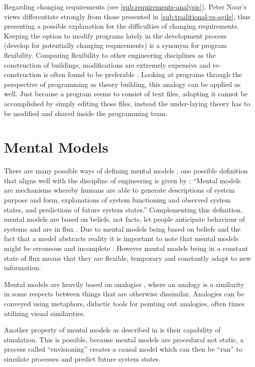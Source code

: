 Regarding changing requirements (see \cref{sub:requirements-analysis}), Peter Naur's views differentiate strongly from those presented in \cref{sub:traditional-vs-agile}, thus presenting a possible explanation for the difficulties of changing requirements.
Keeping the option to modify programs lately in the development process (develop for potentially changing requirements) is a synonym for program flexibility.
Comparing flexibility to other engineering disciplines as the construction of buildings, modifications are extremely expensive and re-construction is often found to be preferable \autocite{naur_programming_1985}.
Looking at programs through the perspective of programming as theory building, this analogy can be applied as well.
Just because a program seems to consist of text files, adapting it cannot be accomplished by simply editing those files, instead the under-laying theory has to be modified and shared inside the programming team.


\section{Mental Models}
\label{sec:mental-models}
There are many possible ways of defining mental models \autocite{herczeg_software-ergonomie_2018}, one possible definition that aligns well with the discipline of engineering is given by \textcite[7]{rouse_looking_1986}: ``Mental models are mechanisms whereby humans are able to generate descriptions of system purpose and form, explanations of system functioning and observed system states, and predictions of future system states.''
Complementing this definition, mental models are based on beliefs, not facts, let people anticipate behaviour of systems and are in flux \autocite{dutke_mentale_1994}.
Due to mental models being based on beliefs and the fact that a model abstracts reality it is important to note that mental models might be erroneous and incomplete \autocite{herczeg_software-ergonomie_2018}.
However mental models being in a constant state of flux means that they are flexible, temporary and constantly adapt to new information.

Mental models are heavily based on analogies \autocite{dutke_mentale_1994}, where an analogy is a similarity in some respects between things that are otherwise dissimilar.
Analogies can be conveyed using metaphors, didactic tools for pointing out analogies, often times utilizing visual similarities.

Another property of mental models as described in \textcite{dutke_mentale_1994} is their capability of simulation.
This is possible, because mental models are procedural not static, a process called ``envisioning'' creates a causal model which can then be ``run'' to simulate processes and predict future system states.

